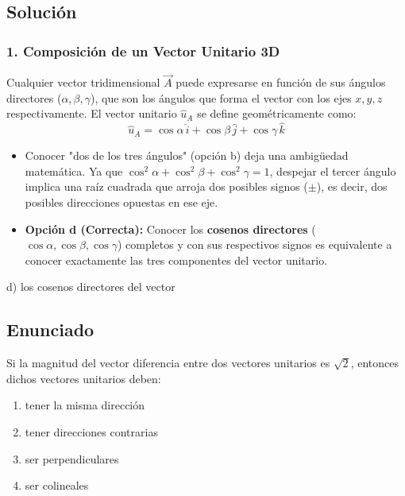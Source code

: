 \documentclass[12pt, a4paper]{article}
\begin{document}
\subsection*{Solución}

\subsubsection*{1. Composición de un Vector Unitario 3D}
Cualquier vector tridimensional $\vec{A}$ puede expresarse en función de sus ángulos directores ($\alpha, \beta, \gamma$), que son los ángulos que forma el vector con los ejes $x, y, z$ respectivamente.
El vector unitario $\hat{u}_A$ se define geométricamente como:
$$ \hat{u}_A = \cos\alpha \, \hat{i} + \cos\beta \, \hat{j} + \cos\gamma \, \hat{k} $$

\begin{itemize}
    \item Conocer "dos de los tres ángulos" (opción b) deja una ambigüedad matemática. Ya que $\cos^2\alpha + \cos^2\beta + \cos^2\gamma = 1$, despejar el tercer ángulo implica una raíz cuadrada que arroja dos posibles signos ($\pm$), es decir, dos posibles direcciones opuestas en ese eje.
    \item \textbf{Opción d (Correcta):} Conocer los \textbf{cosenos directores} ($\cos\alpha, \cos\beta, \cos\gamma$) completos y con sus respectivos signos es equivalente a conocer exactamente las tres componentes del vector unitario.
\end{itemize}

\begin{tcolorbox}[colback=green!5!white, colframe=green!50!black, title=Respuesta Final]
\centering \Large d) los cosenos directores del vector
\end{tcolorbox}

\newpage


\subsection*{Enunciado}
Si la magnitud del vector diferencia entre dos vectores unitarios es $\sqrt{2}$, entonces dichos vectores unitarios deben:
\begin{enumerate}[label=\alph*)]
    \item tener la misma dirección
    \item tener direcciones contrarias
    \item ser perpendiculares
    \item ser colineales
\end{enumerate}
\end{document}
